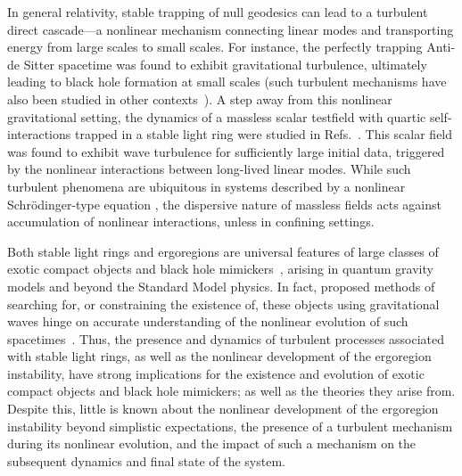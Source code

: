 \documentclass[aps,prl,notitlepage,superscriptaddress,twocolumn]{revtex4-1}
\begin{document}
{In general relativity, stable trapping of null geodesics can lead to a turbulent direct cascade---a nonlinear mechanism connecting linear modes and transporting energy from large scales to small scales. For instance, the perfectly trapping Anti-de Sitter spacetime was found to exhibit gravitational turbulence, ultimately leading to black hole formation at small scales \cite{Bizon:2011gg,Jalmuzna:2011qw,Buchel:2012uh,Balasubramanian:2014cja,Craps:2014vaa,Bizon:2015pfa,Evnin:2021buq} (such turbulent mechanisms have also been studied in other contexts~\cite{Galtier:2017mve,Galtier:2021ovg,Benomio:2018ivy,Bhattacharyya:2007vjd,Carrasco:2012nf,Adams:2013vsa,Green:2013zba,Krynicki:2025fzi,Gay:2024kay,Liang:2025lek,Andrade:2019rpn,Yang:2014tla,Iuliano:2024ogr,Figueras:2023ihz,Ma:2025rnv,Detweiler:1977gy,Hod:2008zz,Yang:2012pj,Cardoso:2013pza,Holzegel:2013kna}). A step away from this nonlinear gravitational setting, the dynamics of a massless scalar testfield with quartic self-interactions trapped in a stable light ring were studied in Refs.~\cite{Benomio:2024lev,Redondo-Yuste:2025hlv}. This scalar field was found to exhibit wave turbulence for sufficiently large initial data, triggered by the nonlinear interactions between long-lived linear modes. While such turbulent phenomena are ubiquitous in systems described by a nonlinear Schrödinger-type equation \cite{zakharov2012kolmogorov,Galtier_2022,nazarenko}, the dispersive nature of massless fields acts against accumulation of nonlinear interactions, unless in confining settings.

Both stable light rings and ergoregions are universal features of large classes of exotic compact objects and black hole mimickers~\cite{Cardoso:2019rvt,Bambi:2025wjx,Carballo-Rubio:2025fnc}, arising in quantum gravity models and beyond the Standard Model physics. In fact, proposed methods of searching for, or constraining the existence of, these objects using gravitational waves hinge on accurate understanding of the nonlinear evolution of such spacetimes~\cite{Barausse:2018vdb,Mastrogiovanni:2025ixe,Fan:2017cfw}. Thus, the presence and dynamics of turbulent processes associated with stable light rings, as well as the nonlinear development of the ergoregion instability, have strong implications for the existence and evolution of exotic compact objects and black hole mimickers; as well as the theories they arise from. Despite this, little is known about the nonlinear development of the ergoregion instability beyond simplistic expectations, the presence of a turbulent mechanism during its nonlinear evolution, and the impact of such a mechanism on the subsequent dynamics and final state of the system.

}
\end{document}
